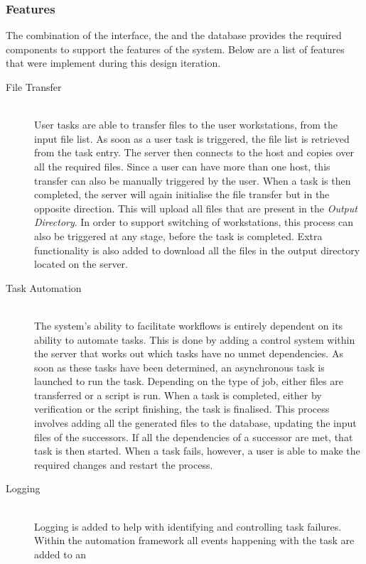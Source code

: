 \subsubsection{Features}
The combination of the interface, the and the database provides the required components
to support the features of the system. Below
are a list of features that were implement during this design iteration.
\begin{description}
    \item[File Transfer] \hfill \\
        User tasks are able to transfer files to the user workstations, from the input
        file list. As soon as a user task is triggered, the file list is retrieved
        from the task entry. The server then connects to the host and copies over all
        the required files. Since a user can have more than one host, this transfer can also
        be manually triggered by the user. When a task is then completed, the server will
        again initialise the file transfer but in the opposite direction. This
	will upload all files that are present in the \emph{Output Directory}. In order
	to support switching of workstations,
        this process can also be triggered at any stage, before the task is completed.
        Extra functionality is also added to download all the files in the output directory
        located on the server.
    \item[Task Automation] \hfill \\
        The system's ability to facilitate workflows is entirely dependent on its ability
        to automate tasks. This is done by adding a control system within the server
        that works out which tasks have no unmet dependencies. As soon as these tasks
        have been determined, an asynchronous task is launched to run the task. Depending on
        the type of job, either files are transferred or a script is run. When a task is
        completed, either by verification or the script finishing, the task is finalised.
        This process involves adding all the generated files to the database, updating the
        input files of the successors. If all the dependencies of a successor
	are met, that task is then started. When a task fails, however, a user is able to
	make the required changes and restart the process.
    \item[Logging] \hfill \\
        Logging is added to help with identifying and controlling task failures. Within
        the automation framework all events happening with the task are added to an

\end{description}
